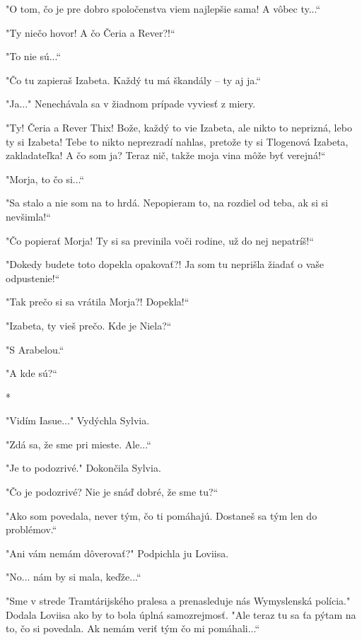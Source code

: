\documentclass{book}
\begin{document}
"$ $O tom, čo je pre dobro spoločenstva viem najlepšie sama! A vôbec ty...“

"$ $Ty niečo hovor! A čo Čeria a Rever?!“

"$ $To nie sú...“

"$ $Čo tu zapieraš Izabeta. Každý tu má škandály – ty aj ja.“

"$ $Ja..."$ $ Nenechávala sa v žiadnom prípade vyviesť z miery.

"$ $Ty! Čeria a Rever Thix! Bože, každý to vie Izabeta, ale nikto to neprizná, lebo ty si Izabeta! Tebe to nikto neprezradí nahlas, pretože ty si Tlogenová Izabeta, zakladateľka! A čo som ja? Teraz nič, takže moja vina môže byť verejná!“

"$ $Morja, to čo si...“

"$ $Sa stalo a nie som na to hrdá. Nepopieram to, na rozdiel od teba, ak si si nevšimla!“

"$ $Čo popierať Morja! Ty si sa previnila voči rodine, už do nej nepatríš!“

"$ $Dokedy budete toto dopekla opakovať?! Ja som tu neprišla žiadať o vaše odpustenie!“

"$ $Tak prečo si sa vrátila Morja?! Dopekla!“

"$ $Izabeta, ty vieš prečo. Kde je Niela?“

"$ $S Arabelou.“

"$ $A kde sú?“

\begin{center}

*

\end{center}

"$ $Vidím Iasue..."$ $ Vydýchla Sylvia.

"$ $Zdá sa, že sme pri mieste. Ale...“

"$ $Je to podozrivé."$ $ Dokončila Sylvia.

"$ $Čo je podozrivé? Nie je snáď dobré, že sme tu?“

"$ $Ako som povedala, never tým, čo ti pomáhajú. Dostaneš sa tým len do problémov.“

"$ $Ani vám nemám dôverovať?"$ $ Podpichla ju Loviisa.

"$ $No... nám by si mala, keďže...“

"$ $Sme v strede Tramtárijského pralesa a prenasleduje nás Wymyslenská polícia."$ $ Dodala Loviisa ako by to bola úplná samozrejmosť. "$ $Ale teraz tu sa ťa pýtam na to, čo si povedala. Ak nemám veriť tým čo mi pomáhali...“
\end{document}
